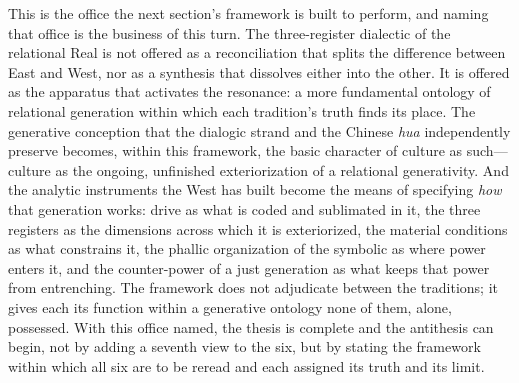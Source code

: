 This is the office the next section's framework is built to perform, and naming that office is the business of this turn. The three-register dialectic of the relational Real is not offered as a reconciliation that splits the difference between East and West, nor as a synthesis that dissolves either into the other. It is offered as the apparatus that activates the resonance: a more fundamental ontology of relational generation within which each tradition's truth finds its place. The generative conception that the dialogic strand and the Chinese \emph{hua} independently preserve becomes, within this framework, the basic character of culture as such---culture as the ongoing, unfinished exteriorization of a relational generativity. And the analytic instruments the West has built become the means of specifying \emph{how} that generation works: drive as what is coded and sublimated in it, the three registers as the dimensions across which it is exteriorized, the material conditions as what constrains it, the phallic organization of the symbolic as where power enters it, and the counter-power of a just generation as what keeps that power from entrenching. The framework does not adjudicate between the traditions; it gives each its function within a generative ontology none of them, alone, possessed. With this office named, the thesis is complete and the antithesis can begin, not by adding a seventh view to the six, but by stating the framework within which all six are to be reread and each assigned its truth and its limit.
